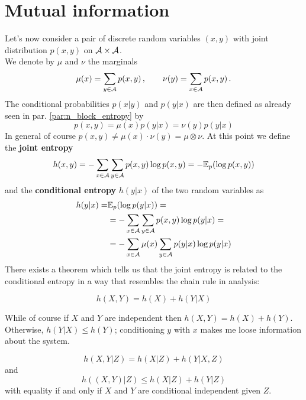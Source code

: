 \section{Mutual information}
\label{par:mutual_information}
Let's now consider a pair of discrete random variables $(x, y)$ with joint distribution $p(x, y)$ on $\mathcal{A} \times \mathcal{A}$.   
\\We denote by $\mu$ and $\nu$ the marginals 
\begin{equation}
    \mu(x) = \sum_{y \in \mathcal{A}} p(x,y) \, , \qquad \nu(y) = \sum_{x \in \mathcal{A}} p(x,y) \, .
\end{equation}
The conditional probabilities $p(x|y)$ and $p(y|x)$ are then defined as already seen in par. \cref{par:n_block_entropy} by 
\begin{equation}
    p(x,y) = \mu(x) p(y|x) = \nu(y) p(y|x) 
\end{equation}
In general of course $p(x,y) \neq \mu(x) \cdot \nu(y) = \mu \otimes \nu$. At this point we define the \textbf{joint entropy} 
\begin{equation}
    h(x,y) = - \sum_{x \in \mathcal{A}} \sum_{y \in \mathcal{A}} p(x,y) \log p(x,y) = - \mathbb{E}_p (\log p(x,y))
\end{equation}
and the \textbf{conditional entropy} $h(y|x)$ of the two random variables as
\begin{align}
    h(y|x) = & \mathbb{E}_p (\log p(y|x)) = \\ 
    & = - \sum_{x \in \mathcal{A}} \sum_{y \in \mathcal{A}} p(x,y) \log p(y|x) = \\ & = - \sum_{x \in \mathcal{A}} \mu(x) \sum_{y \in \mathcal{A}} p(y|x) \log p(y|x)    
\end{align}
There exists a theorem which tells us that the joint entropy is related to the conditional entropy in a way that resembles the chain rule in analysis:
\begin{theorem}
\label{eq:chain_rule}
    \begin{equation}
        h(X,Y) = h(X) + h(Y|X)
    \end{equation}
\end{theorem}
While of course if $X$ and $Y$ are independent then $h(X,Y) = h(X) + h(Y)$. Otherwise, $h(Y|X) \leq h(Y)$; conditioning $y$ with $x$ makes me loose information about the system.
\begin{corollary}
    \begin{equation}
        h(X, Y|Z) = h(X|Z) + h(Y| X,Z)
    \end{equation}
    and
    \begin{equation}
        h((X, Y)|Z) \leq h(X|Z) + h(Y|Z)
    \end{equation}
    with equality if and only if $X$ and $Y$ are conditional independent given $Z$.
\end{corollary}
